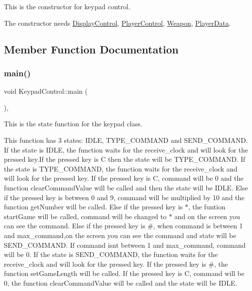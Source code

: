 This is the constructor for keypad control. 

The constructor needs \mbox{\hyperlink{class_display_control}{Display\+Control}}, \mbox{\hyperlink{class_player_control}{Player\+Control}}, \mbox{\hyperlink{class_weapon}{Weapon}}, \mbox{\hyperlink{class_player_data}{Player\+Data}}. 

\subsection{Member Function Documentation}
\mbox{\label{class_keypad_control_a66ec8a33eceb20d5d1d243c270c3718b}} 
\subsubsection{\texorpdfstring{main()}{main()}\hspace{0.1cm}{\footnotesize\ttfamily [1/2]}}
{\footnotesize\ttfamily void Keypad\+Control\+::main (\begin{DoxyParamCaption}{ }\end{DoxyParamCaption})\hspace{0.3cm}{\ttfamily [inline]}, {\ttfamily [override]}}



This is the state function for the keypad class. 

This function has 3 states\+: I\+D\+LE, T\+Y\+P\+E\+\_\+\+C\+O\+M\+M\+A\+ND and S\+E\+N\+D\+\_\+\+C\+O\+M\+M\+A\+ND. If the state is I\+D\+LE, the function waits for the receive\+\_\+clock and will look for the pressed key.\+If the pressed key is C then the state will be T\+Y\+P\+E\+\_\+\+C\+O\+M\+M\+A\+ND. If the state is T\+Y\+P\+E\+\_\+\+C\+O\+M\+M\+A\+ND, the function waits for the receive\+\_\+clock and will look for the pressed key. If the pressed key is C, command will be 0 and the function clear\+Command\+Value will be called and then the state will be I\+D\+LE. Else if the pressed key is between 0 and 9, command will be multiplied by 10 and the function get\+Number will be called. Else if the pressed key is $\ast$, the funtion start\+Game will be called, command will be changed to $\ast$ and on the screen you can see the command. Else if the pressed key is \#, when command is between 1 and max\+\_\+command,on the screen you can see the command and state will be S\+E\+N\+D\+\_\+\+C\+O\+M\+M\+A\+ND. If command isn\textquotesingle{}t between 1 and max\+\_\+command, command will be 0. If the state is S\+E\+N\+D\+\_\+\+C\+O\+M\+M\+A\+ND, the function waits for the receive\+\_\+clock and will look for the pressed key. If the pressed key is \#, the function set\+Game\+Length will be called. If the pressed key is C, command will be 0, the function clear\+Command\+Value will be called and the state will be I\+D\+LE. \mbox{\label{class_keypad_control_a66ec8a33eceb20d5d1d243c270c3718b}} 
